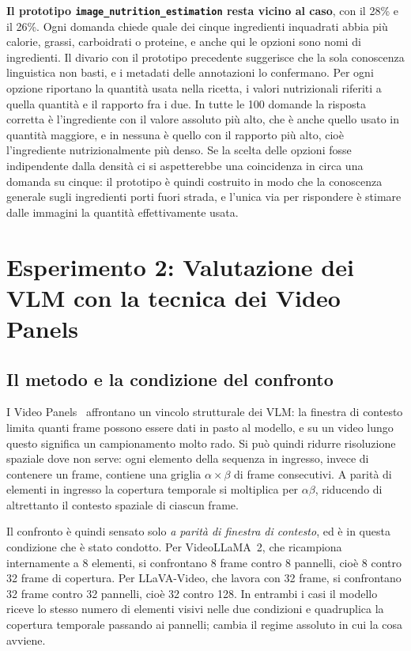 \documentclass{article}
\begin{document}
\textbf{Il prototipo \texttt{image\_nutrition\allowbreak\_estimation} resta vicino al
caso}, con il 28\% e il 26\%. Ogni domanda chiede quale dei cinque ingredienti
inquadrati abbia più calorie, grassi, carboidrati o proteine, e anche qui le
opzioni sono nomi di ingredienti. Il divario con il prototipo precedente
suggerisce che la sola conoscenza linguistica non basti, e i metadati delle
annotazioni lo confermano. Per ogni opzione riportano la quantità usata nella
ricetta, i valori nutrizionali riferiti a quella quantità e il rapporto fra i
due. In tutte le 100 domande la risposta corretta è l'ingrediente con il valore
assoluto più alto, che è anche quello usato in quantità maggiore, e in nessuna
è quello con il rapporto più alto, cioè l'ingrediente nutrizionalmente più
denso. Se la scelta delle opzioni fosse indipendente dalla densità ci si
aspetterebbe una coincidenza in circa una domanda su cinque: il prototipo è
quindi costruito in modo che la conoscenza generale sugli ingredienti porti
fuori strada, e l'unica via per rispondere è stimare dalle immagini la quantità
effettivamente usata.

\section{Esperimento 2: Valutazione dei VLM con la tecnica dei Video Panels}
\label{sec:panels}

\subsection{Il metodo e la condizione del confronto}

I Video Panels~\cite{videopanels} affrontano un vincolo strutturale dei VLM: la
finestra di contesto limita quanti frame possono essere dati in pasto al
modello, e su un video lungo questo significa un campionamento molto rado. Si può quindi ridurre risoluzione spaziale dove non serve: ogni elemento
della sequenza in ingresso, invece di contenere un frame, contiene una
griglia $\alpha \times \beta$ di frame consecutivi. A parità di elementi in
ingresso la copertura temporale si moltiplica per $\alpha\beta$, riducendo di altrettanto il contesto spaziale di ciascun frame.

Il confronto è quindi sensato solo \emph{a parità di finestra di contesto}, ed è
in questa condizione che è stato condotto. Per VideoLLaMA~2, che ricampiona
internamente a 8 elementi, si confrontano 8 frame contro 8 pannelli, cioè 8
contro 32 frame di copertura. Per LLaVA-Video, che lavora con 32 frame, si
confrontano 32 frame contro 32 pannelli, cioè 32 contro 128. In entrambi i
casi il modello riceve lo stesso numero di elementi visivi nelle due condizioni e
quadruplica la copertura temporale passando ai pannelli; cambia il regime
assoluto in cui la cosa avviene.
\end{document}
